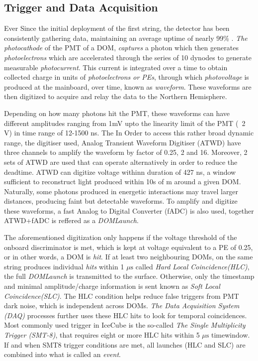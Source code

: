 \subsection{Trigger and Data Acquisition}
\label{sec:DAQ}
Ever Since the initial deployment of the first string, the detector has been consistently gathering data, maintaining an average uptime of nearly 99\% . \emph{The photocathode} of the PMT of a DOM, \emph{captures} a photon which then generates \emph{photoelectrons} which are accelerated through the series of 10 dynodes to generate measurable \emph{photocurrent}. This current is integrated over a time to obtain collected charge in units of \emph{photoelectrons or PEs}, through which \emph{photovoltage} is produced at the mainboard, over time, known as \emph{waveform}. These waveforms are then digitized to acquire and relay the data to the Northern Hemisphere.

Depending on how many photons hit the PMT, these waveforms can have different amplitudes ranging from 1mV upto the linearity limit of the PMT (~2 V) in time range of 12-1500 ns. The In Order to access this rather broad dynamic range, the digitiser used, Analog Transient Waveform Digitiser (ATWD) have three channels to amplify the waveform by factor of 0.25, 2 and 16. Moreover, 2 sets of ATWD are used that can operate alternatively in order to reduce the deadtime. ATWD can digitize voltage withinn duration of 427 ns, a window sufficient to reconstruct light produced within 10s of m around a given DOM. Naturally, some photons produced in energetic interactions may travel larger distances, producing faint but detectable waveforms. To amplify and digitize these waveforms, a fast Analog to Digital Converter (fADC) is also used, together ATWD+fADC is reffered as a \emph{DOMLaunch}.

The aforementioned digitization only happens if the voltage threshold of the onboard discriminator is met, which is kept at voltage equivalent to a PE of 0.25, or in other words, a DOM is \emph{hit}. If at least two neighbouring DOMs, on the same string produces individual \emph{hits} within 1 $\mu\mathrm{s}$ called \emph{Hard Local Coincidence(HLC)}, the full \emph{DOMLaunch} is transmitted to the surface. Otherwise, only the timestamp and minimal amplitude/charge information is sent known as \emph{Soft Local Coincidence(SLC)}. The HLC condition helps reduce false triggers from PMT dark noise, which is independent across DOMs. \emph{The Data Acquisition System (DAQ)} processes further uses these HLC hits to look for temporal coincidences. Most commonly used trigger in IceCube is the so-called \emph{The Single Multiplicity Trigger (SMT-8)}, that requires eight or more HLC hits within 5 $\mu\mathrm{s}$ timewindow. If and when SMT8 trigger conditions are met, all launches (HLC and SLC) are combined into what is called an \emph{event}. 

